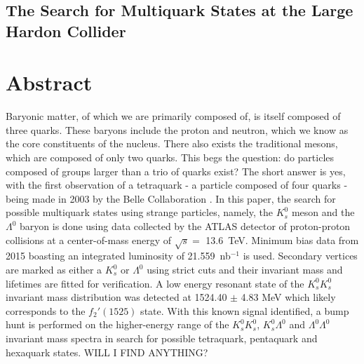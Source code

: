 \documentclass{article}
\date{October 12, 2023} %
\begin{document}
\large
\begin{center}
\section*{The Search for Multiquark States at the Large Hardon Collider}
\end{center}
\normalsize 




\section*{Abstract}
Baryonic matter, of which we are primarily composed of, is itself composed of three quarks.
These baryons include the proton and neutron, which we know as the core constituents of the 
nucleus. There also exists the traditional mesons, which are composed of only two quarks. This begs the question:
do particles composed of groups larger than a trio of quarks exist? The short answer is yes, 
with the first observation of a tetraquark - a particle composed of four quarks - being made 
in 2003 by the Belle Collaboration \cite{MultiquarkDiscovery}.
In this paper, the search for possible multiquark states using strange particles, namely, the 
$K^0_s$ meson and the $\Lambda^0$ baryon is done using data collected by the ATLAS detector 
of proton-proton collisions at a center-of-mass energy of $\sqrt{s} =$ \SI{13.6}{TeV}. Minimum
bias data from 2015 boasting an integrated luminosity of \SI{21.559}{nb}$^{-1}$ is used. Secondary 
vertices are marked as either a $K^0_s$ or $\Lambda^0$ using strict cuts and their invariant mass and 
lifetimes are fitted for verification. A low energy resonant state of the $K^0_sK^0_s$ invariant 
mass distribution was detected at 1524.40 $\pm$ 4.83 MeV which likely corresponds to the 
$f_2'(1525)$ state. With this known signal identified, a bump hunt is performed on the higher-energy
range of the $K^0_sK^0_s$, $K^0_s\Lambda^0$ and $\Lambda^0\Lambda^0$ invariant mass spectra
in search for possible tetraquark, pentaquark and hexaquark states. WILL I FIND ANYTHING?
\end{document}
